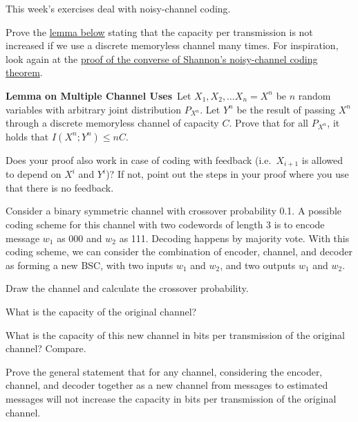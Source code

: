 \documentclass[a4paper,10pt,landscape,twocolumn]{scrartcl}
\begin{document}
\practiceproblems

{\sffamily\noindent
This week's exercises deal with noisy-channel coding. \practiceinstructions
}


\begin{exercise}
Prove the \href{https://canvas.uva.nl/courses/2205/pages/definition-channel-capacity#lemma}{lemma below} stating that the capacity per transmission is not increased if we use a discrete memoryless channel many times. For inspiration, look again at the \href{https://canvas.uva.nl/courses/2205/pages/noisy-channel-theorem-converse}{proof of the converse of Shannon's noisy-channel coding theorem}.

\medskip
\noindent\textbf{Lemma on Multiple Channel Uses}\  Let $X_1, X_2, \ldots X_n = X^n$ be $n$ random variables with arbitrary joint distribution $P_{X^n}$. Let $Y^n$ be the result of passing $X^n$ through a discrete memoryless channel of capacity $C$. Prove that for all $P_{X^n}$, it holds that $I(X^n; Y^n) \leq nC$.
\medskip

Does your proof also work in case of coding with feedback (i.e.\ $X_{i+1}$ is allowed to depend on $X^i$ and $Y^i$)? If not, point out the steps in your proof where you use that there is no feedback.
\end{exercise}




\begin{exercise}
Consider a binary symmetric channel with crossover probability 0.1. A possible coding scheme for this channel with two codewords of length 3 is to encode message $w_1$ as 000 and $w_2$ as 111. Decoding happens by majority vote. With this coding scheme, we can consider the combination of encoder, channel, and decoder as forming a new BSC, with two inputs $w_1$ and $w_2$, and two outputs $w_1$ and $w_2$.

\begin{subex}
Draw the channel and calculate the crossover probability.
\end{subex}

\begin{subex}
What is the capacity of the original channel?
\end{subex}

\begin{subex}
What is the capacity of this new channel in bits per transmission of the original channel? Compare.
\end{subex}

\begin{subex}
Prove the general statement that for any channel, considering the encoder, channel, and decoder together as a new channel from messages to estimated messages will not increase the capacity in bits per transmission of the original channel.
\end{subex}

\end{exercise}
\end{document}
